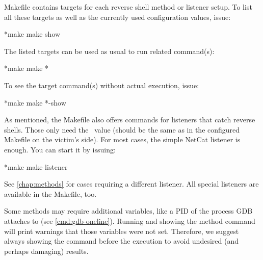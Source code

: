 Makefile contains targets for each reverse shell method or listener setup. To list all these targets as well as the currently used configuration values, issue:

\begin{cmdline}{*}{make}{}
make show
\end{cmdline}

The listed targets can be used as usual to run related command(s):

\begin{cmdline}{*}{make}{}
make *\target*
\end{cmdline}

To see the target command(s) without actual execution, issue:

\begin{cmdline}{*}{make}{}
make *\target*-show
\end{cmdline}

As mentioned, the Makefile also offers commands for listeners that catch reverse shells. Those only need the \port\ value (should be the same as in the configured Makefile on the victim's side). For most cases, the simple NetCat listener is enough. You can start it by issuing:

\begin{cmdline}{*}{make}{}
make listener
\end{cmdline}

See \cref{chap:methods} for cases requiring a different listener. All special listeners are available in the Makefile, too.

Some methods may require additional variables, like a PID of the process GDB attaches to (see \cref{cmd:gdb-oneline}). Running and showing the method command will print warnings that those variables were not set. Therefore, we suggest always showing the command before the execution to avoid undesired (and perhaps damaging) results.
